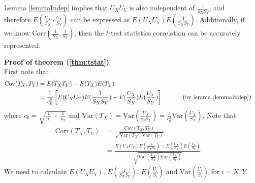 \documentclass[12pt, a4paper]{article}
\newcommand{\cov}{\text{Cov}}
\newcommand{\cor}{\text{Corr}}
\newcommand{\var}{\text{Var}}
\begin{document}
	
	Lemma \ref{lemmaIndep} implies that  $U_XU_Y$ is also independent of $\frac{1}{S_XS_Y}$, and
	therefore $E(\frac{U_X}{S_X} \cdot\frac{U_Y}{S_Y})$ can be expressed as
	$E(U_XU_Y)E(\frac{1}{S_XS_Y})$. Additionally, if we know $\cor(\frac{1}{S_X}, \frac{1}{S_Y})$,
	then the $t$-test statistics correlation can be accurately represented. 
	
	\textbf{Proof of theorem (\ref{thm:tstat})} \\
	First note that
	\begin{align*}
		\cov(T_X, T_Y) &= E(T_XT_Y) - E(T_X)E(T_Y) \\
		& = \frac{1}{c_0^2} \left[E(U_XU_Y)E(\frac{1}{S_XS_Y}) - E(\frac{U_X}{S_X})E( \frac{U_Y}{S_Y})\right]   
		~~~~~~~~~\text{ (by lemma \ref{lemmaIndep})}
	\end{align*}
	where $c_0 = \sqrt{\frac{1}{n_1} + \frac{1}{n_2}}$ and $\var(T_X) = \var(\frac{U_X}{c_0S_X})=
	\frac{1}{c_0^2}\var(\frac{U_X}{S_X})$. 
	Note that 
	\begin{equation}\label{eq:Tcorrelation}
		\begin{aligned}
			\cor(T_X, T_Y) & = \frac{\cov(T_X, T_Y) }{\sqrt{\var(T_X) \var(T_Y) }} \\
			& = \frac{E(U_XU_Y)E(\frac{1}{S_XS_Y}) - E(\frac{U_X}{S_X})E(
				\frac{U_Y}{S_Y})}{\sqrt{\var(\frac{U_X}{S_X})\var(\frac{U_Y}{S_Y})}} 
		\end{aligned}
	\end{equation}
	We need to calculate $E(U_XU_Y)$, $E(\frac{1}{S_XS_Y})$, $ E(\frac{U_i}{S_i})$ and
	$\var(\frac{U_i}{S_i})$ for $i =X, Y$. 
\end{document}
